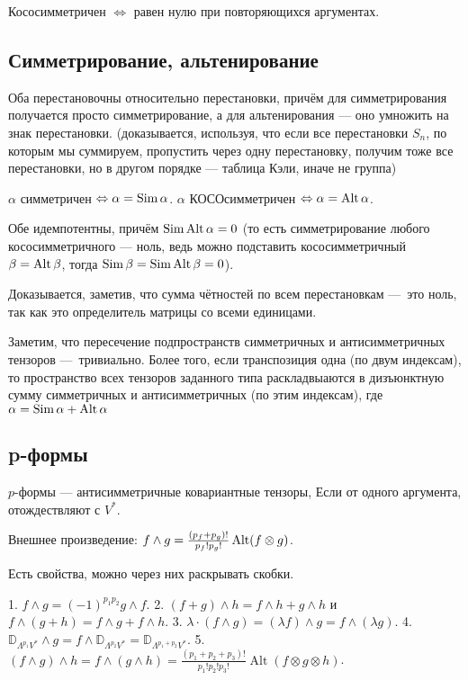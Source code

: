 \documentclass[12pt, a4paper]{article}
\begin{document}
Кососимметричен $\Leftrightarrow$ равен нулю при повторяющихся аргументах.

\subsection{Симметрирование, альтенирование}

Оба перестановочны относительно перестановки, 
причём для симметрирования получается просто симметрирование,
а для альтенирования — оно умножить на знак перестановки.
(доказывается, используя, что если все перестановки $S_n$, по которым мы суммируем,
пропустить через одну перестановку, получим тоже все перестановки, но в другом порядке — таблица Кэли, иначе не группа)

$\alpha$ симметричен $\Leftrightarrow \alpha = \operatorname{Sim} \alpha$.
$\alpha$ КОСОсимметричен $\Leftrightarrow \alpha = \operatorname{Alt} \alpha$.

Обе идемпотентны, причём $\operatorname{Sim} \operatorname{Alt} \alpha = 0$ 
(то есть симметрирование любого кососимметричного — ноль, ведь можно подставить кососимметричный
$\beta = \operatorname{Alt} \beta$, тогда $\operatorname{Sim} \beta = \operatorname{Sim} \operatorname{Alt} \beta = 0$).

Доказывается, заметив, что сумма чётностей по всем перестановкам — это ноль, 
так как это определитель матрицы со всеми единицами.

Заметим, что пересечение подпространств симметричных и антисимметричных тензоров — тривиально.
Более того, если транспозиция одна (по двум индексам), 
то пространство всех тензоров заданного типа раскладвыаются в дизъюнктную сумму симметричных и антисимметричных (по этим индексам), 
где $\alpha = \operatorname{Sim} \alpha + \operatorname{Alt} \alpha$

\subsection{p-формы}

$p$-формы — антисимметричные ковариантные тензоры, Если от одного аргумента, отождествляют с $V^*$.

Внешнее произведение: $f \land g = \frac{(p_f + p_g)!}{p_f! p_g!} \operatorname{Alt} (f \otimes g)$.

Есть свойства, можно через них раскрывать скобки.

1. $f \wedge g=(-1)^{p_{1} p_{2}} g \wedge f$.
2. $(f+g) \wedge h=f \wedge h+g \wedge h$ и $f \wedge(g+h)=f \wedge g+f \wedge h$.
3. $\lambda \cdot(f \wedge g)=(\lambda f) \wedge g=f \wedge(\lambda g)$.
4. $\mathbb{D}_{\Lambda^{p_{1}} V^{*}} \wedge g=f \wedge \mathbb{\mathbb { D }}_{\Lambda^{p_{2}} V^{*}}=\mathbb{D}_{\Lambda^{p_{1}+p_{2}} V^{*}}$.
5. $(f \wedge g) \wedge h=f \wedge(g \wedge h)=\frac{\left(p_{1}+p_{2}+p_{3}\right) !}{p_{1} ! p_{2} ! p_{3} !} \operatorname{Alt}(f \otimes g \otimes h)$.
\end{document}

